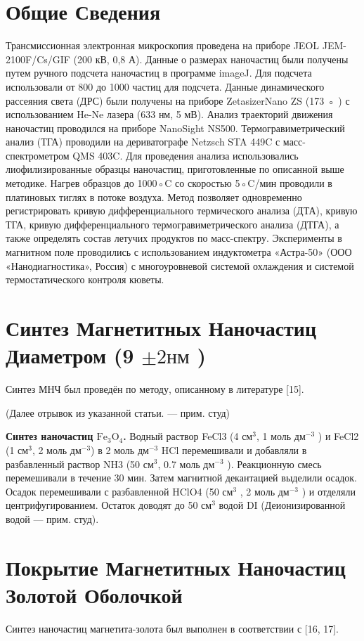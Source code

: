 \documentclass[10pt, a4paper]{article}
\begin{document}
\section*{Общие Сведения}
  Трансмиссионная электронная микроскопия проведена на приборе JEOL JEM-2100F/Cs/GIF (200 кВ, 0,8 А). Данные о
  размерах наночастиц были получены путем ручного подсчета наночастиц в программе imageJ. Для подсчета использовали от 800 до 1000 частиц
  для подсчета. Данные динамического рассеяния света (ДРС) были получены на приборе ZetasizerNano ZS (173 ◦ ) с использованием He-Ne
  лазера (633 нм, 5 мВ). Анализ траекторий движения наночастиц проводился на приборе NanoSight NS500. Термогравиметрический
  анализ (ТГА) проводили на дериватографе Netzsch STA 449C с масс-спектрометром QMS 403C. Для проведения
  анализа использовались лиофилизированные образцы наночастиц, приготовленные по описанной выше методике. Нагрев образцов
  до 1000◦C со скоростью 5◦C/мин проводили в платиновых тиглях в потоке воздуха. Метод позволяет одновременно регистрировать
  кривую дифференциального термического анализа (ДТА), кривую ТГА, кривую дифференциального термогравиметрического анализа (ДТГА), а также
  определять состав летучих продуктов по масс-спектру. Эксперименты в магнитном поле проводились
  с использованием индуктометра «Астра-50» (ООО «Нанодиагностика», Россия) с многоуровневой системой охлаждения и системой
  термостатического контроля кюветы.
  
\section*{Синтез Магнетитных Наночастиц Диаметром (9 \(\pm 2 \text{нм}\) )}
  Синтез МНЧ был проведён по методу, описанному в литературе [15].
  
  (Далее отрывок из указанной статьи. --- прим. студ)
  
  \textbf{Синтез наночастиц $\text{Fe}_3\text{O}_4$.}  Водный раствор FeCl3 (4 $\text{см}^3$, 1 моль $\text{дм}^{-3}$ ) и FeCl2 (1 $\text{см}^3$, 2 моль $\text{дм}^{-3}$) в 2 моль $\text{дм}^{-3}$ HCl перемешивали и добавляли в разбавленный раствор NH3 (50 $\text{см}^3$, 0.7 моль $\text{дм}^{-3}$ ). Реакционную смесь перемешивали в течение 30 мин. Затем магнитной декантацией выделили осадок. Осадок перемешивали с разбавленной HClO4 (50 $\text{см}^3$ , 2 моль $\text{дм}^{-3}$ ) и отделяли центрифугированием. Остаток доводят до 50 $\text{см}^3$ водой DI (Деионизированной водой --- прим. студ). 
  
\section*{Покрытие Магнетитных Наночастиц Золотой Оболочкой}
  Синтез наночастиц магнетита-золота был выполнен в соответствии с [16, 17].
  
\end{document}
